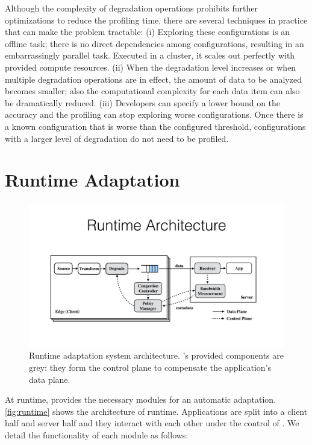 Although the complexity of degradation operations prohibits further
optimizations to reduce the profiling time, there are several techniques in
practice that can make the problem tractable: (i) Exploring these configurations
is an offline task; there is no direct dependencies among configurations,
resulting in an embarrassingly parallel task. Executed in a cluster, it scales
out perfectly with provided compute resources. (ii) When the degradation level
increases or when multiple degradation operations are in effect, the amount of
data to be analyzed becomes smaller; also the computational complexity for each
data item can also be dramatically reduced. (iii) Developers can specify a lower
bound on the accuracy and the profiling can stop exploring worse configurations.
Once there is a known configuration that is worse than the configured threshold,
configurations with a larger level of degradation do not need to be profiled.

\section{Runtime Adaptation}
\label{sec:adaptation}

\begin{figure}
  \centering
  \includegraphics[width=\linewidth]{figures/runtime.pdf}
  \caption{Runtime adaptation system architecture. \sysname{}'s provided
    components are grey: they form the control plane to compensate the
    application's data plane.}
  \label{fig:runtime}
\end{figure}

At runtime, \sysname{} provides the necessary modules for an automatic
adaptation. \autoref{fig:runtime} shows the architecture of \sysname{}
runtime. Applications are split into a client half and server half and they
interact with each other under the control of \sysname{}. We detail the
functionality of each module as follows:

